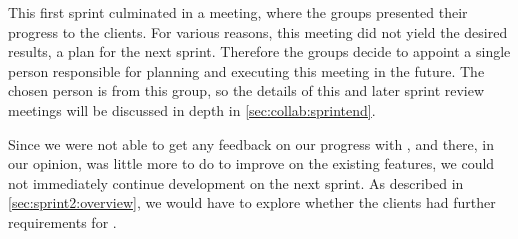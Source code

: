 This first sprint culminated in a meeting, where the groups presented their progress to the clients.
For various reasons, this meeting did not yield the desired results, a plan for the next sprint.
Therefore the groups decide to appoint a single person responsible for planning and executing this meeting in the future.
The chosen person is from this group, so the details of this and later sprint review meetings will be discussed in depth in \cref{sec:collab:sprintend}.

Since we were not able to get any feedback on our progress with \launcher, and there, in our opinion, was little more to do to improve on the existing features, we could not immediately continue development on the next sprint. As described in \cref{sec:sprint2:overview}, we would have to explore whether the clients had further requirements for \launcher. 
